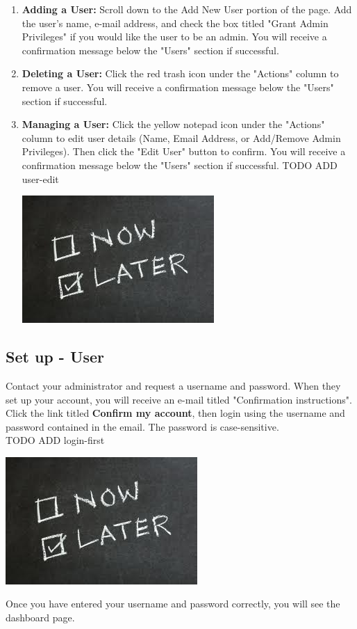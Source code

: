     \begin{enumerate}
      \item \textbf{Adding a User:} Scroll down to the Add New User portion of the page.  Add the user's name, 
      e-mail address, and check the box titled "Grant Admin Privileges" if you would like the user to be an
      admin.  You will receive a confirmation message below the "Users" section if successful.

      \item \textbf{Deleting a User:} Click the red trash icon under the "Actions" column to remove a user. 
      You will receive a confirmation message below the "Users" section if successful.

      \item \textbf{Managing a User:} Click the yellow notepad icon under the "Actions" column to edit user 
      details (Name, Email Address, or Add/Remove Admin Privileges).  Then click the "Edit User" button to confirm.
      You will receive a confirmation message below the "Users" section if successful.
TODO ADD user-edit
      \begin{center}
      \includegraphics[scale=1]{images/Now-Later.png}
    \end{center}  
    \end{enumerate}

  \subsection{Set up - User}
      Contact your administrator and request a username and password. When they set up your account, 
      you will receive an e-mail titled "Confirmation instructions".  Click the link titled \textbf{Confirm 
      my account}, then login using the username and password contained in the email.  The password is case-sensitive.\\
TODO ADD login-first
      \begin{center}
      \includegraphics[scale=1]{images/Now-Later.png}
    \end{center} 
      Once you have entered your username and password correctly, you will see the dashboard page.

